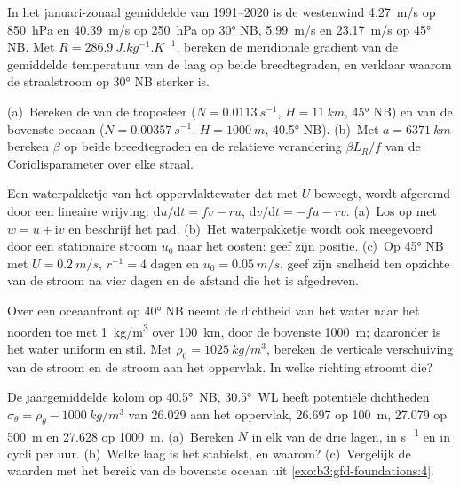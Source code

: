 \begin{exercise}[$\star\star$]\label{exo:b3:gfd-foundations:8}
In het januari-zonaal gemiddelde van 1991--2020 is de westenwind \qty{4.27}{m/s}
op \qty{850}{hPa} en \qty{40.39}{m/s} op \qty{250}{hPa} op \ang{30} NB,
\qty{5.99}{m/s} en \qty{23.17}{m/s} op \ang{45} NB. Met $R =
\qty{286.9}{J.kg^{-1}.K^{-1}}$, bereken de meridionale gradiënt van de
gemiddelde temperatuur van de laag op beide breedtegraden, en verklaar waarom de
straalstroom op \ang{30} NB sterker is.
\end{exercise}

\begin{exercise}[$\star\star$]\label{exo:b3:gfd-foundations:9}
(a)~Bereken de  van de troposfeer ($N =
\qty{0.0113}{s^{-1}}$, $H = \qty{11}{km}$, \ang{45} NB) en van de bovenste
oceaan ($N = \qty{0.00357}{s^{-1}}$, $H = \qty{1000}{m}$, \ang{40.5} NB).
(b)~Met $a = \qty{6371}{km}$ bereken $\beta$ op beide breedtegraden en de
relatieve verandering $\beta L_R/f$ van de Coriolisparameter over elke straal.
\end{exercise}

\begin{exercise}[$\star\star\star$]\label{exo:b3:gfd-foundations:10}
Een waterpakketje van het oppervlaktewater dat met $U$ beweegt, wordt afgeremd door een lineaire
wrijving: $\mathrm du/\mathrm dt = fv - ru$, $\mathrm dv/\mathrm dt = -fu -
rv$. (a)~Los op met $w = u + \mathrm iv$ en beschrijf het pad. (b)~Het
waterpakketje wordt ook meegevoerd door een stationaire stroom $u_0$ naar het oosten: geef zijn
positie. (c)~Op \ang{45} NB met $U = \qty{0.2}{m/s}$, $r^{-1} =
\num{4}\text{ dagen}$ en $u_0 = \qty{0.05}{m/s}$, geef zijn snelheid ten opzichte van de
stroom na vier dagen en de afstand die het is afgedreven.
\end{exercise}

\begin{exercise}[$\star\star\star$]\label{exo:b3:gfd-foundations:11}
Over een oceaanfront op \ang{40} NB neemt de dichtheid van het water naar het noorden toe
met \qty{1}{kg/m^3} over \qty{100}{km}, door de bovenste
\qty{1000}{m}; daaronder is het water uniform en stil. Met $\rho_0 =
\qty{1025}{kg/m^3}$, bereken de verticale verschuiving van de stroom en de
stroom aan het oppervlak. In welke richting stroomt die?
\end{exercise}

\begin{exercise}[$\star\star\star$]\label{exo:b3:gfd-foundations:12}
De jaargemiddelde kolom op \ang{40.5}~NB, \ang{30.5}~WL heeft potentiële
dichtheden $\sigma_\theta = \rho_\theta - \qty{1000}{kg/m^3}$ van 26.029 aan
het oppervlak, 26.697 op \qty{100}{m}, 27.079 op \qty{500}{m} en 27.628 op
\qty{1000}{m}. (a)~Bereken $N$ in elk van de drie lagen, in
\unit{s^{-1}} en in cycli per uur. (b)~Welke laag is het stabielst,
en waarom? (c)~Vergelijk de waarden met het bereik van de bovenste oceaan uit
\cref{exo:b3:gfd-foundations:4}.
\end{exercise}

